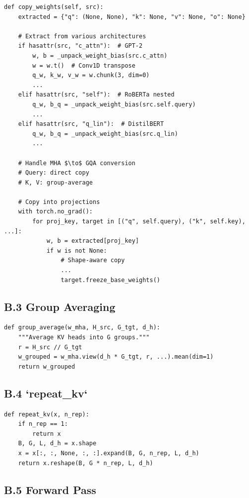 \begin{lstlisting}
def copy_weights(self, src):
    extracted = {"q": (None, None), "k": None, "v": None, "o": None}
    
    # Extract from various architectures
    if hasattr(src, "c_attn"):  # GPT-2
        w, b = _unpack_weight_bias(src.c_attn)
        w = w.t()  # Conv1D transpose
        q_w, k_w, v_w = w.chunk(3, dim=0)
        ...
    elif hasattr(src, "self"):  # RoBERTa nested
        q_w, b_q = _unpack_weight_bias(src.self.query)
        ...
    elif hasattr(src, "q_lin"):  # DistilBERT
        q_w, b_q = _unpack_weight_bias(src.q_lin)
        ...
    
    # Handle MHA $\to$ GQA conversion
    # Query: direct copy
    # K, V: group-average
    
    # Copy into projections
    with torch.no_grad():
        for proj_key, target in [("q", self.query), ("k", self.key), ...]:
            w, b = extracted[proj_key]
            if w is not None:
                # Shape-aware copy
                ...
                target.freeze_base_weights()
\end{lstlisting}

\subsection{B.3 Group Averaging}

\begin{lstlisting}
def group_average(w_mha, H_src, G_tgt, d_h):
    """Average KV heads into G groups."""
    r = H_src // G_tgt
    w_grouped = w_mha.view(d_h * G_tgt, r, ...).mean(dim=1)
    return w_grouped
\end{lstlisting}

\subsection{B.4 `repeat\_kv`}

\begin{lstlisting}
def repeat_kv(x, n_rep):
    if n_rep == 1:
        return x
    B, G, L, d_h = x.shape
    x = x[:, :, None, :, :].expand(B, G, n_rep, L, d_h)
    return x.reshape(B, G * n_rep, L, d_h)
\end{lstlisting}

\subsection{B.5 Forward Pass}


